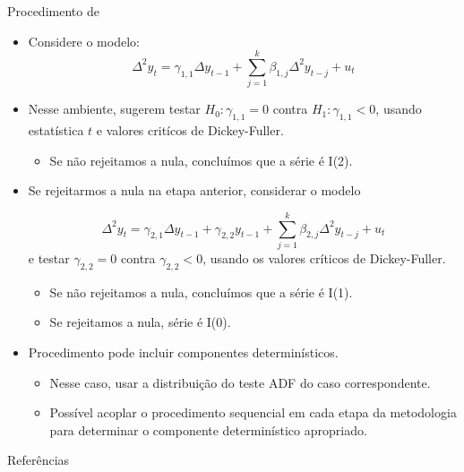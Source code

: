\documentclass[11pt]{beamer}
\begin{document}
\begin{frame}{Procedimento de \citet{Dickey1987}}
	\begin{itemize}
		\small 
		\item Considere o modelo:
		\begin{equation*}
			\Delta^2 y_t = \gamma_{1,1} \Delta y_{t-1} + \sum_{j=1}^{k} \beta_{1,j} \Delta^2 y_{t-j} + u_t
		\end{equation*}
		\item Nesse ambiente, \citet{Dickey1987} sugerem testar $H_0: \gamma_{1,1} = 0 $ contra $H_1: \gamma_{1,1} < 0$, usando estatística $t$ e valores critícos de Dickey-Fuller.
			\begin{itemize}
				\item Se não rejeitamos a nula, concluímos que a série é I(2).
			\end{itemize}
		\item Se rejeitarmos a nula na etapa anterior, considerar o modelo
		
				\begin{equation*}
			\Delta^2 y_t =\gamma_{2,1} \Delta y_{t-1} + \gamma_{2,2} y_{t-1} +  \sum_{j=1}^{k} \beta_{2,j} \Delta^2 y_{t-j} +  u_t
		\end{equation*}
		e testar $\gamma_{2,2}=0$ contra $\gamma_{2,2} < 0$, usando os valores críticos de Dickey-Fuller.
		\vspace{-1em}
		\begin{itemize}
			\item Se não rejeitamos a nula, concluímos que a série é I(1).
			\item Se rejeitamos a nula, série é I(0).
		\end{itemize}
		\item Procedimento pode incluir componentes determinísticos.
		\begin{itemize}
			\item Nesse caso, usar a distribuição do teste ADF do caso correspondente.
			\item Possível acoplar o procedimento sequencial em cada etapa da metodologia para determinar o componente determinístico apropriado.
		\end{itemize}
	\end{itemize}
\end{frame}


\begin{frame}[allowframebreaks]{Referências}
	\printbibliography
\end{frame}
\end{document}
